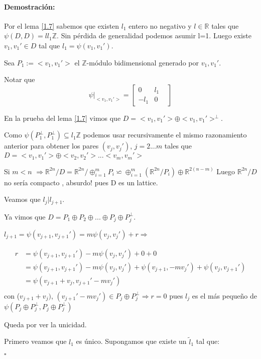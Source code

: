 \documentclass[12pt]{article}
\newenvironment{proof}{\paragraph{Demostración:}}{\hfill$\square$}
\begin{document}
\begin{proof}
Por el lema \ref{1.7} sabemos que existen $l_1$ entero no negativo y $l \in \mathbb{R}$ tales que  $\psi(D,D)  = l l_1 \mathbb{Z}$. Sin pérdida de generalidad podemos asumir l=1.
Luego existe $v_1,v_1' \in D$ tal que  $l_1=\psi(v_1,v_1')$.

Sea $P_1:=<v_1,v_1'>$ el $\mathbb{Z}$-módulo bidimensional generado por $v_1,v_1'$.

Notar que $$
\psi|_{<v_1,v_1'>} = \begin{bmatrix}
                              0 & l_1 &\\
                              -l_1 & 0 &
                             \end{bmatrix}
$$

En la prueba del lema \ref{1.7} vimos que $D=<v_1,v_1'> \oplus <v_1,v_1'>^\bot$.

Como $\psi(P_1^\bot,P_1^\bot) \subseteq l_1 \mathbb{Z}$ podemos usar recursivamente el mismo razonamiento anterior 
para obtener los pares $(v_j,v_j')$, $j=2...m$ tales que 
$D=<v_1,v_1'>\oplus<v_2,v_2'>...<v_m,v_m'>$

Si $m<n$ $\Rightarrow \mathbb{R}^{2n}/D=\mathbb{R}^{2n}/\oplus_{i=1}^m P_i \backsimeq \oplus_{i=1}^m (\mathbb{R}^{2n}/P_i) \oplus \mathbb{R}^{2(n-m)} $\newline
Luego $\mathbb{R}^{2n}/ D$ no sería compacto , absurdo! pues D es un lattice.
\newline


Veamos que $l_j|l_{j+1}$.

Ya vimos que $D= P_1\oplus P_2 \oplus...\oplus P_j \oplus P_j^\bot$.

$l_{j+1}=\psi(v_{j+1},v_{j+1}')=m \psi(v_j,v_j') +r \Rightarrow$ 

$$\begin{aligned}
r&=\psi(v_{j+1},v_{j+1}')-m \psi(v_j,v_j') + 0 + 0\\
&=\psi(v_{j+1},v_{j+1}')-m \psi(v_j,v_j') +  \psi(v_{j+1},-mv_j') + \psi(v_j,v_{j+1}')\\
&=\psi(v_{j+1} + v_j, v_{j+1}'-m v_j') \\
\end{aligned}$$ 
con ($v_{j+1} + v_j) $, $(v_{j+1}'-m v_j') \in P_j \oplus P_j^\bot \Rightarrow
r=0$ pues $l_j$ es el más pequeño de $\psi(P_j \oplus P_j^\bot, P_j \oplus P_j^\bot)$
\newline

Queda por ver la unicidad.

Primero veamos que $l_1$ es único. Supongamos que  existe un $\tilde{l}_1$ tal que: 


\end{proof}
\end{document}
